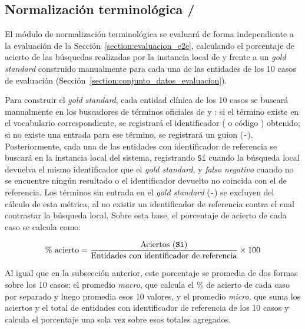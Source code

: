 \subsection{Normalización terminológica /}\label{subsection:evaluacion_snomed}

El módulo de normalización terminológica se evaluará de forma independiente a la evaluación
 de la Sección~\ref{section:evaluacion_e2e}, calculando el porcentaje de
acierto de las búsquedas realizadas por la instancia local de  y
 frente a un \textit{gold standard} construido manualmente para cada una de
las entidades de los 10 casos de evaluación (Sección~\ref{section:conjunto_datos_evaluacion}).

Para construir el \textit{gold standard}, cada entidad clínica de los 10 casos se buscará
manualmente en los buscadores de términos oficiales de  y
: si el término existe en el vocabulario correspondiente, se registrará el
identificador ( o código ) obtenido; si no existe
una entrada para ese término, se registrará un guion (\texttt{-}). Posteriormente, cada una de las
entidades con identificador de referencia se buscará en la instancia local del sistema, registrando
\texttt{Sí} cuando la búsqueda local devuelva el mismo identificador que el \textit{gold standard},
y \textit{falso negativo} cuando no se encuentre ningún resultado o el identificador devuelto no
coincida con el de referencia. Los términos sin entrada en el \textit{gold standard} (\texttt{-})
se excluyen del cálculo de esta métrica, al no existir un identificador de referencia contra el cual
contrastar la búsqueda local. Sobre esta base, el porcentaje de acierto de cada caso se calcula como:

\begin{gather*}
    \text{\% acierto} = \frac{\text{Aciertos (\texttt{Sí})}}{\text{Entidades con identificador de referencia}} \times 100
\end{gather*}

Al igual que en la subsección anterior, este porcentaje se promedia de dos formas sobre los 10
casos: el promedio \textit{macro}, que calcula el \% de acierto de cada caso por separado y luego
promedia esos 10 valores, y el promedio \textit{micro}, que suma los aciertos y el total de
entidades con identificador de referencia de los 10 casos y calcula el porcentaje una sola vez sobre
esos totales agregados.

